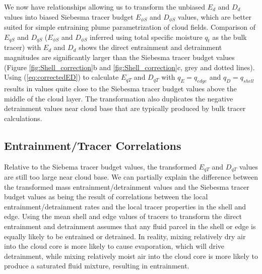\documentclass[12pt]{article}
\begin{document}
We now have relationships allowing us to transform the unbiased
$E_{d}$ and $D_{d}$ values into biased Siebesma tracer budget
$E_{\phi S}$ and $D_{\phi S}$ values, which are better suited for
simple entraining plume parametrization of cloud fields.
Comparison of $E_{q S}$ and $D_{q S}$ ($E_{\phi S}$ and $D_{\phi S}$ inferred
using total specific moisture $q_t$ as the bulk tracer) with $E_d$ and $D_d$
shows the direct entrainment and detrainment magnitudes are significantly larger 
than the Siebesma tracer budget values (Figure \ref{fig:Shell_correction}b 
and \ref{fig:Shell_correction}c, grey and dotted lines).  
Using  (\ref{eq:correctedED}) to calculate $E_{q T}$ and $D_{q T}$ with
$q_E = q_{edge}$ and $q_D = q_{shell}$ results in values quite close to 
the Siebesma tracer budget values above the middle of the cloud layer.   
The transformation also duplicates the negative 
detrainment values near cloud base that are typically produced by bulk tracer
calculations.


\subsection{Entrainment/Tracer Correlations}

Relative to the Siebema tracer budget
values, the transformed $E_{q T}$ and $D_{q T}$ values are still too large 
near cloud base. 
We can partially explain the difference between the transformed mass 
entrainment/detrainment values and the Siebesma tracer budget values as 
being the result of correlations between the local entrainment/detrainment 
rates and the local tracer properties in the shell and edge.  Using the 
mean shell and edge values of tracers to transform the direct entrainment 
and detrainment assumes that any fluid parcel in the shell or edge is 
equally likely to be entrained or detrained.  In reality, mixing relatively 
dry air into the cloud core is more likely to cause evaporation, which will 
drive detrainment, while mixing relatively moist air into the cloud core is 
more likely to produce a saturated fluid mixture, resulting in entrainment.
\end{document}
